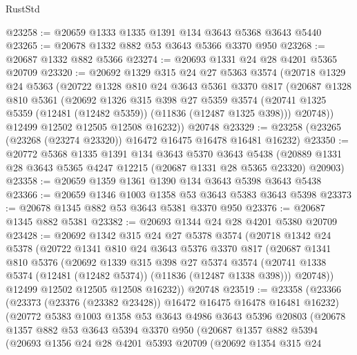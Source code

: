 \begin{lexlean}{RustStd}
\begin{coremodule}
@23258 := @20659 @1333 @1335 @1391 @134 @3643 @5368 @3643 @5440
@23265 := @20678 @1332 @882 @53 @3643 @5366 @3370 @950
@23268 := @20687 @1332 @882 @5366
@23274 := @20693 @1331 @24 @28 @4201 @5365 @20709
@23320 := @20692
    @1329
    @315
    @24
    @27
    @5363
    @3574
    (@20718
      @1329
      @24
      @5363
      (@20722
        @1328
        @810
        @24
        @3643
        @5361
        @3370
        @817
        (@20687
          @1328
          @810
          @5361
          (@20692
            @1326
            @315
            @398
            @27
            @5359
            @3574
            (@20741 @1325 @5359 (@12481 (@12482 @5359)) (@11836 (@12487 @1325 @398)))
            @20748))
        @12499
        @12502
        @12505
        @12508
        @16232))
    @20748
@23329 := @23258 (@23265 (@23268 (@23274 @23320)) @16472 @16475 @16478 @16481 @16232)
@23350 := @20772
    @5368
    @1335
    @1391
    @134
    @3643
    @5370
    @3643
    @5438
    (@20889 @1331 @28 @3643 @5365 @4247 @12215 (@20687 @1331 @28 @5365 @23320) @20903)
@23358 := @20659 @1359 @1361 @1390 @134 @3643 @5398 @3643 @5438
@23366 := @20659 @1346 @1003 @1358 @53 @3643 @5383 @3643 @5398
@23373 := @20678 @1345 @882 @53 @3643 @5381 @3370 @950
@23376 := @20687 @1345 @882 @5381
@23382 := @20693 @1344 @24 @28 @4201 @5380 @20709
@23428 := @20692
    @1342
    @315
    @24
    @27
    @5378
    @3574
    (@20718
      @1342
      @24
      @5378
      (@20722
        @1341
        @810
        @24
        @3643
        @5376
        @3370
        @817
        (@20687
          @1341
          @810
          @5376
          (@20692
            @1339
            @315
            @398
            @27
            @5374
            @3574
            (@20741 @1338 @5374 (@12481 (@12482 @5374)) (@11836 (@12487 @1338 @398)))
            @20748))
        @12499
        @12502
        @12505
        @12508
        @16232))
    @20748
@23519 := @23358
    (@23366
      (@23373 (@23376 (@23382 @23428)) @16472 @16475 @16478 @16481 @16232)
      (@20772
        @5383
        @1003
        @1358
        @53
        @3643
        @4986
        @3643
        @5396
        @20803
        (@20678
          @1357
          @882
          @53
          @3643
          @5394
          @3370
          @950
          (@20687
            @1357
            @882
            @5394
            (@20693
              @1356
              @24
              @28
              @4201
              @5393
              @20709
              (@20692
                @1354
                @315
                @24

\end{coremodule}
\end{lexlean}
